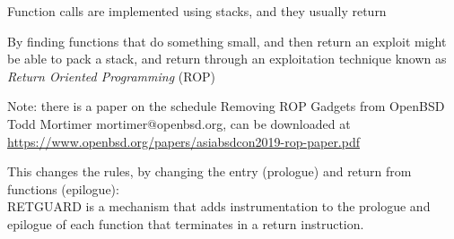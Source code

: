 \documentclass[Screen16to9,17pt]{foils}
\begin{document}
{\footnotesize{}}






\begin{list2}
\item Function calls are implemented using stacks, and they usually return
\item By finding functions that do something small, and then return an exploit might be able to pack a stack, and return through an exploitation technique known as \emph{Return Oriented Programming} (ROP)
\item Note: there is a paper on the schedule Removing ROP Gadgets from OpenBSD Todd Mortimer mortimer@openbsd.org, can be downloaded at\\ \url{https://www.openbsd.org/papers/asiabsdcon2019-rop-paper.pdf}
\item This changes the rules, by changing the entry (prologue) and return from functions (epilogue):\\
RETGUARD is a mechanism that adds instrumentation to the
prologue and epilogue of each function that terminates in a
return instruction.
\end{list2}


\slidenext{}
\end{document}
